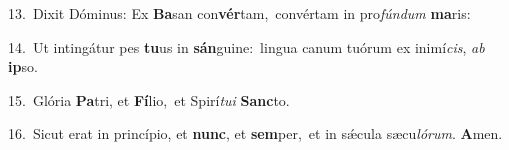 {\numbfont\textcolor{\numbcolor}{13.}}~Dixit Dóminus: Ex \textbf{Ba}\-san con\-\textbf{vér}\-tam,~\star convértam in pro\-\textit{fún}\-\textit{dum} \textbf{ma}\-ris:\par
{\numbfont\textcolor{\numbcolor}{14.}}~Ut intingátur pes \textbf{tu}\-us in \textbf{sán}\-guine:~\star lingua canum tuórum ex inimí\-\textit{cis}\-, \textit{ab} \textbf{ip}\-so.\par
{\numbfont\textcolor{\numbcolor}{15.}}~Glória \textbf{Pa}\-tri, et \textbf{Fí}\-lio,~\star et Spirí\-\textit{tu}\-\textit{i} \textbf{Sanc}\-to.\par
{\numbfont\textcolor{\numbcolor}{16.}}~Sicut erat in princípio, et \textbf{nunc}\-, et \textbf{sem}\-per,~\star et in sǽcula sæcu\-\textit{ló}\-\textit{rum}. \textbf{A}\-men.\par
